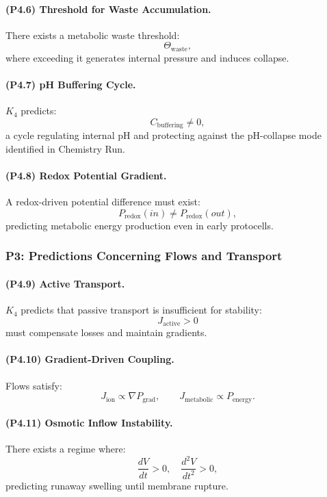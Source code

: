 \paragraph{(P4.6) Threshold for Waste Accumulation.}
There exists a metabolic waste threshold:
\[
\Theta_{\mathrm{waste}},
\]
where exceeding it generates internal pressure and induces collapse.

\paragraph{(P4.7) pH Buffering Cycle.}
$K_4$ predicts:
\[
C_{\mathrm{buffering}} \neq 0,
\]
a cycle regulating internal pH and protecting against the pH-collapse mode
identified in Chemistry Run.

\paragraph{(P4.8) Redox Potential Gradient.}
A redox-driven potential difference must exist:
\[
P_{\mathrm{redox}}(in) \neq P_{\mathrm{redox}}(out),
\]
predicting metabolic energy production even in early protocells.

\subsubsection{P3: Predictions Concerning Flows and Transport}

\paragraph{(P4.9) Active Transport.}
$K_4$ predicts that passive transport is insufficient for stability:
\[
J_{\mathrm{active}} > 0
\]
must compensate losses and maintain gradients.

\paragraph{(P4.10) Gradient-Driven Coupling.}
Flows satisfy:
\[
J_{\mathrm{ion}} \propto \nabla P_{\mathrm{grad}},
\qquad
J_{\mathrm{metabolic}} \propto P_{\mathrm{energy}}.
\]

\paragraph{(P4.11) Osmotic Inflow Instability.}
There exists a regime where:
\[
\frac{dV}{dt} > 0, \quad \frac{d^2V}{dt^2} > 0,
\]
predicting runaway swelling until membrane rupture.

